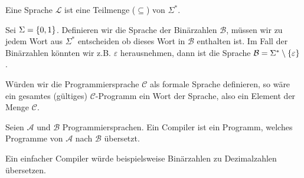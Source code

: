 \begin{defn}[Sprache]
Eine Sprache $\mathcal{L}$ ist eine Teilmenge ($\subseteq$) von $\Sigma^*$.
\end{defn}

Sei $\Sigma=\left\{0,1\right\}$. Definieren wir die Sprache der Binärzahlen $\mathcal{B}$,
müssen wir zu jedem Wort aus $\Sigma^*$ entscheiden ob dieses Wort in $\mathcal{B}$ enthalten ist.
Im Fall der Binärzahlen könnten wir z.B. $\varepsilon$ herausnehmen, dann ist die Sprache
$\mathcal{B}=\Sigma^* \setminus \left\{\varepsilon\right\}$.

Würden wir die Programmiersprache $\mathcal{C}$ als formale Sprache definieren, so wäre
ein gesamtes (gültiges) $\mathcal{C}$-Programm ein Wort der Sprache, also ein Element der Menge $\mathcal{C}$.

\begin{defn}[Compiler]
Seien $\mathcal{A}$ und $\mathcal{B}$ Programmiersprachen. Ein Compiler ist ein Programm, welches Programme von $\mathcal{A}$ nach $\mathcal{B}$ übersetzt.
\end{defn}

Ein einfacher Compiler würde beispielsweise Binärzahlen zu Dezimalzahlen übersetzen.
\newpage
{}
